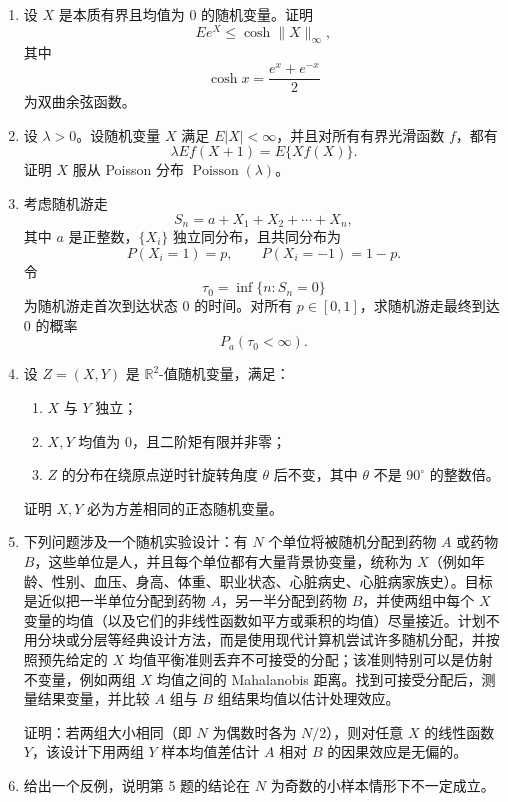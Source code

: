 \documentclass[UTF8,12pt]{ctexart}
\begin{document}
\begin{enumerate}[label=\textbf{\arabic*.},leftmargin=2.2em]
\item 设 \(X\) 是本质有界且均值为 \(0\) 的随机变量。证明
\[
E e^X\le \cosh \|X\|_\infty,
\]
其中
\[
\cosh x=\frac{e^x+e^{-x}}2
\]
为双曲余弦函数。

\item 设 \(\lambda>0\)。设随机变量 \(X\) 满足 \(E|X|<\infty\)，并且对所有有界光滑函数 \(f\)，都有
\[
\lambda E f(X+1)=E\{Xf(X)\}.
\]
证明 \(X\) 服从 Poisson 分布 \(\operatorname{Poisson}(\lambda)\)。

\item 考虑随机游走
\[
S_n=a+X_1+X_2+\cdots+X_n,
\]
其中 \(a\) 是正整数，\(\{X_i\}\) 独立同分布，且共同分布为
\[
P(X_i=1)=p,\qquad P(X_i=-1)=1-p.
\]
令
\[
\tau_0=\inf\{n:S_n=0\}
\]
为随机游走首次到达状态 \(0\) 的时间。对所有 \(p\in[0,1]\)，求随机游走最终到达 \(0\) 的概率
\[
P_a(\tau_0<\infty).
\]

\item 设 \(Z=(X,Y)\) 是 \(\mathbb R^2\)-值随机变量，满足：
\begin{enumerate}[label=\textbf{(\arabic*)},leftmargin=2.4em]
\item \(X\) 与 \(Y\) 独立；
\item \(X,Y\) 均值为 \(0\)，且二阶矩有限并非零；
\item \(Z\) 的分布在绕原点逆时针旋转角度 \(\theta\) 后不变，其中 \(\theta\) 不是 \(90^\circ\) 的整数倍。
\end{enumerate}
证明 \(X,Y\) 必为方差相同的正态随机变量。

\item 下列问题涉及一个随机实验设计：有 \(N\) 个单位将被随机分配到药物 \(A\) 或药物 \(B\)，这些单位是人，并且每个单位都有大量背景协变量，统称为 \(X\)（例如年龄、性别、血压、身高、体重、职业状态、心脏病史、心脏病家族史）。目标是近似把一半单位分配到药物 \(A\)，另一半分配到药物 \(B\)，并使两组中每个 \(X\) 变量的均值（以及它们的非线性函数如平方或乘积的均值）尽量接近。计划不用分块或分层等经典设计方法，而是使用现代计算机尝试许多随机分配，并按照预先给定的 \(X\) 均值平衡准则丢弃不可接受的分配；该准则特别可以是仿射不变量，例如两组 \(X\) 均值之间的 Mahalanobis 距离。找到可接受分配后，测量结果变量，并比较 \(A\) 组与 \(B\) 组结果均值以估计处理效应。

证明：若两组大小相同（即 \(N\) 为偶数时各为 \(N/2\)），则对任意 \(X\) 的线性函数 \(Y\)，该设计下用两组 \(Y\) 样本均值差估计 \(A\) 相对 \(B\) 的因果效应是无偏的。

\item 给出一个反例，说明第 5 题的结论在 \(N\) 为奇数的小样本情形下不一定成立。
\end{enumerate}
\end{document}
